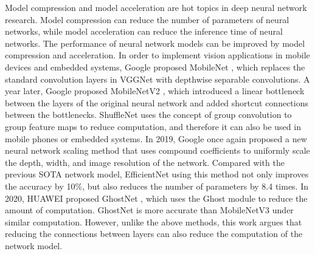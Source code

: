 \documentclass[default,iicol]{sn-jnl}
\theoremstyle{thmstyleone}\newtheorem{theorem}{Theorem}\newtheorem{proposition}[theorem]{Proposition}
\theoremstyle{thmstyletwo}\newtheorem{example}{Example}\newtheorem{remark}{Remark}
\theoremstyle{thmstylethree}\newtheorem{definition}{Definition}
\begin{document}
Model compression and model acceleration are hot topics in deep neural network research. Model compression can reduce the number of parameters of neural networks, while model acceleration can reduce the inference time of neural networks. The performance of neural network models can be improved by model compression and acceleration. In order to implement vision applications in mobile devices and embedded systems, Google proposed MobileNet \cite{howard2017mobilenets}, which replaces the standard convolution layers in VGGNet \cite{simonyan2014very} with depthwise separable convolutions. A year later, Google proposed MobileNetV2 \cite{sandler2018mobilenetv2}, which introduced a linear bottleneck between the layers of the original neural network and added shortcut connections between the bottlenecks. ShuffleNet \cite{zhang2018shufflenet} uses the concept of group convolution to group feature maps to reduce computation, and therefore it can also be used in mobile phones or embedded systems. In 2019, Google once again proposed a new neural network scaling method that uses compound coefficients to uniformly scale the depth, width, and image resolution of the network. Compared with the previous SOTA network model, EfficientNet \cite{tan2019efficientnet} using this method not only improves the accuracy by 10\%, but also reduces the number of parameters by 8.4 times. In 2020, HUAWEI proposed GhostNet \cite{han2020ghostnet}, which uses the Ghost module to reduce the amount of computation. GhostNet is more accurate than MobileNetV3 \cite{howard2019searching} under similar computation. However, unlike the above methods, this work argues that reducing the connections between layers can also reduce the computation of the network model.

\begin{table*}[]
\centering
\caption{Details of TripleNet Model}
\label{tab1}
\end{table*}
\end{document}
